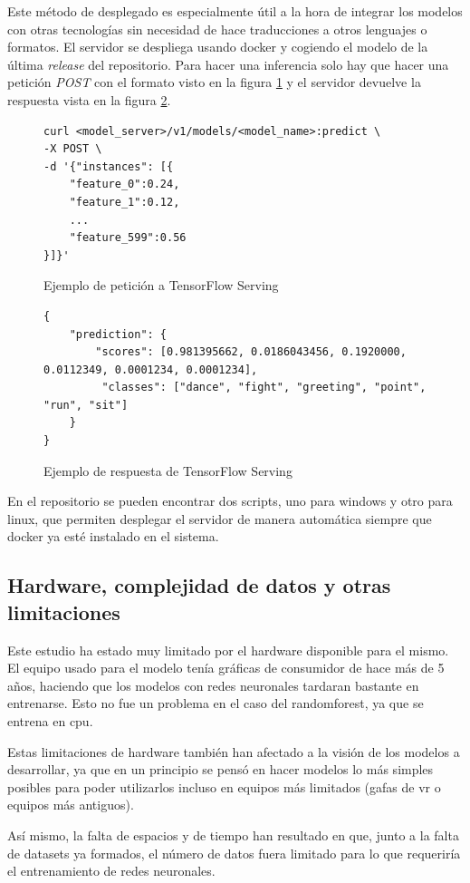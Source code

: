 Este método de desplegado es especialmente útil a la hora de integrar los modelos con otras tecnologías sin necesidad de hace traducciones a otros lenguajes o formatos. El servidor se despliega usando docker y cogiendo el modelo de la última \textit{release} del repositorio. Para hacer una inferencia solo hay que hacer una petición \textit{POST} con el formato visto en la figura \ref{fig:ejemplo-petición} y el servidor devuelve la respuesta vista en la figura \ref{fig:ejemplo-respuesta}.

\begin{figure}[H]
    \centering
    \begin{lstlisting}[style=custombash]
curl <model_server>/v1/models/<model_name>:predict \
-X POST \
-d '{"instances": [{
    "feature_0":0.24,
    "feature_1":0.12,
    ... 
    "feature_599":0.56
}]}'
    \end{lstlisting}
    \caption{Ejemplo de petición a TensorFlow Serving}
    \label{fig:ejemplo-petición}
\end{figure}

\begin{figure}[H]
    \centering
    \begin{lstlisting}[style=custombash]
{
    "prediction": {
        "scores": [0.981395662, 0.0186043456, 0.1920000, 0.0112349, 0.0001234, 0.0001234],
         "classes": ["dance", "fight", "greeting", "point", "run", "sit"]
    }
}
    \end{lstlisting}
    \caption{Ejemplo de respuesta de TensorFlow Serving}
    \label{fig:ejemplo-respuesta}
\end{figure}

En el repositorio se pueden encontrar dos scripts, uno para windows y otro para linux, que permiten desplegar el servidor de manera automática siempre que docker ya esté instalado en el sistema.

\subsection{Hardware, complejidad de datos y otras limitaciones}

Este estudio ha estado muy limitado por el hardware disponible para el mismo. El equipo usado para el modelo tenía gráficas de consumidor de hace más de 5 años, haciendo que los modelos con redes neuronales tardaran bastante en entrenarse. Esto no fue un problema en el caso del \gls{randomforest}, ya que se entrena en \gls{cpu}.

Estas limitaciones de hardware también han afectado a la visión de los modelos a desarrollar, ya que en un principio se pensó en hacer modelos lo más simples posibles para poder utilizarlos incluso en equipos más limitados (gafas de \gls{vr} o equipos más antiguos).

Así mismo, la falta de espacios y de tiempo han resultado en que, junto a la falta de datasets ya formados, el número de datos fuera limitado para lo que requeriría el entrenamiento de redes neuronales.